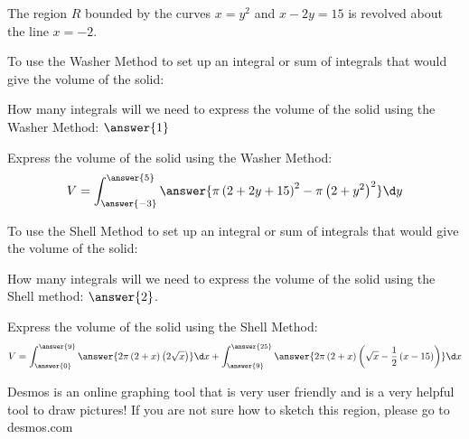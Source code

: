 \documentclass{ximera}
\author{ Jason Miller}
\begin{document}
\begin{exercise}

The region $R$ bounded by the curves $x=y^{2}$ and $x-2y=15$ is revolved about the line $x=-2$. 

To use the Washer Method to set up an integral or sum of integrals that would give the volume of the solid: 

  \begin{multipleChoice}
  \end{multipleChoice}

How many integrals will we need to express the volume of the solid using the Washer Method: $\answer{1}$


\begin{exercise} 
Express the volume of the solid using the Washer Method: 
\[
V=\int_{\answer{-3}}^{\answer{5}} \answer{\pi \left(2+2y+15 \right)^{2}-\pi \left( 2+y^{2}\right)^{2}} \d y 
\] 


\end{exercise}
\end{exercise}

To use the Shell Method to set up an integral or sum of integrals that would give the volume of the solid: 

  \begin{multipleChoice}
  \end{multipleChoice}

How many integrals will we need to express the volume of the solid using the Shell method: $\answer{2}$. 


\begin{exercise}
Express the volume of the solid using the Shell Method: 
\[
V=\int_{\answer{0}}^{\answer{9}} \answer{2\pi \left( 2+x \right) \left(2 \sqrt{x} \right)} \d x + \int_{\answer{9}}^{\answer{25}} \answer{ 2\pi \left( 2 +x \right) \left( \sqrt{x} - \frac{1}{2}\left( x -15 \right) \right) } \d x 
\]

\begin{hint}
Desmos is an online graphing tool that is very user friendly and is a very helpful tool to draw pictures!  If you are not sure how to sketch this region, please go to desmos.com
\end{hint}

\end{exercise}
\end{document}
